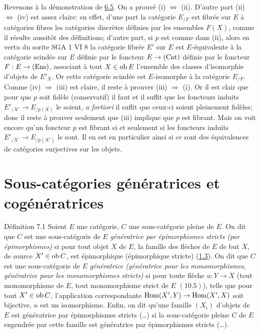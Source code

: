 \documentclass[10pt]{../fichiers-configuration-latex/smfart}
\begin{document}
Revenons à la démonstration de \hyperref[I.prop6.5]{6.5}. On a prouvé (i)
$\Leftrightarrow$ (ii). D'autre part (ii) %
$\Leftrightarrow$ (iv) est assez claire: en effet, d'une part la
catégorie $E_{/F}$ est fibrée sur $E$ à catégories fibres les
catégories discrètes définies par les ensembles $F(X)$, comme il
résulte aussitôt des définitions; d'autre part, si $p$ est comme
dans (ii), alors en vertu du sorite SGA 1 VI 8 la catégorie fibrée
$E'$ sur $E$ est $E$-équivalente à la catégorie scindée sur $E$
définie par le foncteur $E\rightarrow (\operatorname{Cat})$ définie par le
foncteur $F:E\rightarrow (\operatorname{Ens})$, associant à tout $X\in \operatorname{ob} E$
l'ensemble des classes d'isomorphie d'objets de $E'_X$. Or cette
catégorie scindée est $E$-isomorphe à la catégorie $E_{/F}$. Comme
(iv) $\Rightarrow$ (iii) est claire, il reste à prouver (iii)
$\Rightarrow$ (i). Or il est clair que pour que $p$ soit fidèle
(\resp  conservatif) il faut et il suffit que les foncteurs induits
$E'_{/X'}\rightarrow E_{/p(X)}$ le soient, \textit{a fortiori} il
suffit que ceux-ci soient pleinement fidèles; donc il reste à
prouver seulement que (iii) implique que $p$ est fibrant. Mais on
voit encore qu'un foncteur $p$ est fibrant si et seulement si les
foncteurs induits $E'_{/X'}\rightarrow E_{/p(X')}$ le sont. Il en
est en particulier ainsi si ce sont des équivalences de catégories
surjectives sur les objets.

\section{Sous-catégories génératrices et
  cogénératrices}\pageoriginale

\begin{enonce*}{Définition 7.1}
Soient $E$ une catégorie, $C$ une sous-catégorie pleine de $E$. On
dit que $C$ est une sous-catégorie de $E$ \emph{génératrice par
épimorphismes stricts (\resp  par épimorphismes)} si pour tout objet
$X$ de $E$, la famille des flèches de $E$ de but $X$, de source
$X'\in \operatorname{ob} C$, est épimorphique (\resp  épimorphique stricte)
(\hyperref[I.condef1.3]{1.3}). On dit que $C$ est une sous-catégorie de $E$
\emph{génératrice (\resp  génératrice pour les monomorphismes, \resp
génératrice pour les monomorphismes stricts)} si pour toute flèche
$u:Y\rightarrow X$ (\resp  tout monomorphisme de $E$, \resp  tout
monomorphisme strict de $E$ $(10.5)$), telle que pour tout $X'\in
\operatorname{ob} C$, l'application correspondante $\operatorname{Hom}(X',Y)\rightarrow
\operatorname{Hom}(X',X)$ soit bijective, $u$ est un isomorphisme. Enfin, on dit
qu'une famille $(X_i)$ d'objets de $E$ est génératrice par
épimorphismes stricts (\resp \ldots) si la sous-catégorie pleine $C$
de $E$ engendrée par cette famille est génératrice par épimorphismes
stricts (\resp \ldots).
\end{enonce*}
\end{document}
